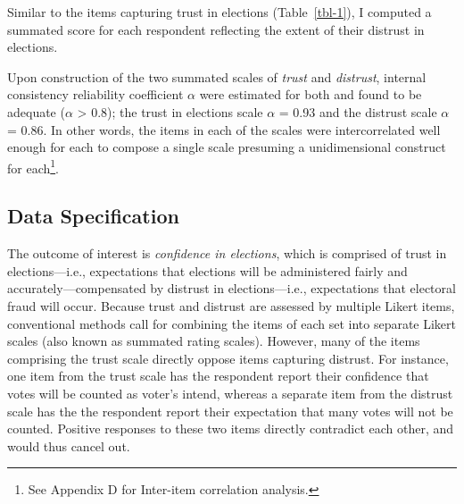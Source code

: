 \documentclass[
  12pt,
  letterpaper,
]{article}
\begin{document}
Similar to the items capturing trust in elections (Table~\ref{tbl-1}), I
computed a summated score for each respondent reflecting the extent of
their distrust in elections.

Upon construction of the two summated scales of \emph{trust} and
\emph{distrust}, internal consistency reliability coefficient \(\alpha\)
were estimated for both and found to be adequate (\(\alpha\)
\textgreater{} 0.8); the trust in elections scale \(\alpha\) = 0.93 and
the distrust scale \(\alpha\) = 0.86. In other words, the items in each
of the scales were intercorrelated well enough for each to compose a
single scale presuming a unidimensional construct for each\footnote{See
  Appendix D for Inter-item correlation analysis.}.

\subsection{Data Specification}\label{data-specification}

The outcome of interest is \emph{confidence in elections}, which is
comprised of trust in elections---i.e., expectations that elections will
be administered fairly and accurately---compensated by distrust in
elections---i.e., expectations that electoral fraud will occur. Because
trust and distrust are assessed by multiple Likert items, conventional
methods call for combining the items of each set into separate Likert
scales (also known as summated rating scales). However, many of the
items comprising the trust scale directly oppose items capturing
distrust. For instance, one item from the trust scale has the respondent
report their confidence that votes will be counted as voter's intend,
whereas a separate item from the distrust scale has the the respondent
report their expectation that many votes will not be counted. Positive
responses to these two items directly contradict each other, and would
thus cancel out.
\end{document}
